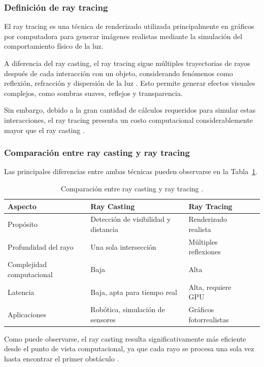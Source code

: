 \subsubsection{Definición de ray tracing}

El ray tracing es una técnica de renderizado utilizada principalmente en gráficos por computadora para generar imágenes realistas mediante la simulación del comportamiento físico de la luz.

A diferencia del ray casting, el ray tracing sigue múltiples trayectorias de rayos después de cada interacción con un objeto, considerando fenómenos como reflexión, refracción y dispersión de la luz \cite{stackoverflow_raycasting}. Esto permite generar efectos visuales complejos, como sombras suaves, reflejos y transparencia.

Sin embargo, debido a la gran cantidad de cálculos requeridos para simular estas interacciones, el ray tracing presenta un costo computacional considerablemente mayor que el ray casting \cite{stackoverflow_raycasting}.

\subsubsection{Comparación entre ray casting y ray tracing}

Las principales diferencias entre ambas técnicas pueden observarse en la Tabla~\ref{tabla_raycasting}.

\begin{table}[H]
\centering
\begin{tabular}{llll}
\hline
Aspecto & Ray Casting & Ray Tracing \\
\hline
Propósito & Detección de visibilidad y distancia & Renderizado realista \\
Profundidad del rayo & Una sola intersección & Múltiples reflexiones \\
Complejidad computacional & Baja & Alta \\
Latencia & Baja, apta para tiempo real & Alta, requiere GPU \\
Aplicaciones & Robótica, simulación de sensores & Gráficos fotorrealistas \\
\hline
\end{tabular}
\caption{Comparación entre ray casting y ray tracing \cite{stackoverflow_raycasting}.}
\label{tabla_raycasting}
\end{table}

Como puede observarse, el ray casting resulta significativamente más eficiente desde el punto de vista computacional, ya que cada rayo se procesa una sola vez hasta encontrar el primer obstáculo \cite{stackoverflow_raycasting}.

